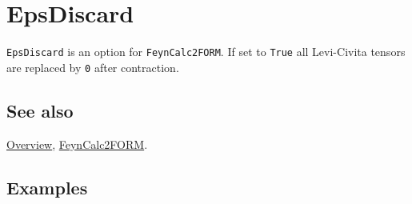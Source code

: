 \documentclass[../FeynCalcManual.tex]{subfiles}
\begin{document}
\hypertarget{epsdiscard}{
\section{EpsDiscard}\label{epsdiscard}}

\texttt{EpsDiscard} is an option for \texttt{FeynCalc2FORM}. If set to
\texttt{True} all Levi-Civita tensors are replaced by \texttt{0} after
contraction.

\subsection{See also}

\hyperlink{toc}{Overview}, \hyperlink{feyncalc2form}{FeynCalc2FORM}.

\subsection{Examples}
\end{document}
